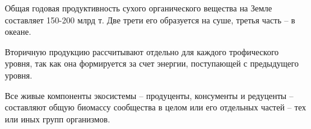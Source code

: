 \documentclass[a5paper, 11pt]{extarticle}
\theoremstyle{definition}
\theoremstyle{definition}
\theoremstyle{definition}
\numberwithin{figure}{section}
\begin{document}
Общая годовая продуктивность сухого органического вещества на Земле составляет 150-200 млрд т. Две трети его образуется на суше, третья часть -- в океане.

Вторичную продукцию рассчитывают отдельно для каждого трофического уровня, так как она формируется за счет энергии, поступающей с предыдущего уровня.

Все живые компоненты экосистемы -- продуценты, консументы и редуценты -- составляют общую биомассу сообщества в целом или его отдельных частей -- тех или иных групп организмов.
\end{document}

